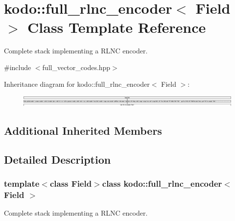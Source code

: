 \hypertarget{classkodo_1_1full__rlnc__encoder}{\section{kodo\-:\-:full\-\_\-rlnc\-\_\-encoder$<$ Field $>$ Class Template Reference}
\label{classkodo_1_1full__rlnc__encoder}
}


Complete stack implementing a R\-L\-N\-C encoder.  




{\ttfamily \#include $<$full\-\_\-vector\-\_\-codes.\-hpp$>$}

Inheritance diagram for kodo\-:\-:full\-\_\-rlnc\-\_\-encoder$<$ Field $>$\-:\begin{figure}[H]
\begin{center}
\leavevmode
\includegraphics[height=0.601504cm]{classkodo_1_1full__rlnc__encoder}
\end{center}
\end{figure}
\subsection*{Additional Inherited Members}


\subsection{Detailed Description}
\subsubsection*{template$<$class Field$>$class kodo\-::full\-\_\-rlnc\-\_\-encoder$<$ Field $>$}

Complete stack implementing a R\-L\-N\-C encoder. 

